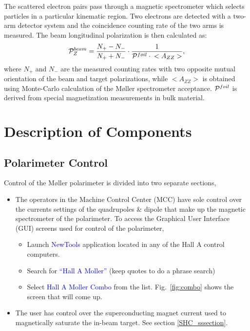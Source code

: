 {The scattered electron pairs pass through a magnetic spectrometer
which selects particles in a particular kinematic region. Two electrons
are detected with a two-arm detector system and the 
coincidence counting rate of the two arms is measured.
The beam longitudinal polarization is then calculated as:
\begin{displaymath}
           {\cal P}^{beam}_{Z} = \frac{N_{+}-N_{-}}{N_{+}+N_{-}}\cdot{}
      \frac{1}{{\cal P}^{foil}\cdot{}<A_{ZZ}>},
\end{displaymath}
where $N_{+}$ and $N_{-}$ are the measured counting rates with two opposite
mutual orientation of the beam and target polarizations, while 
$<A_{ZZ}>$ is obtained using Monte-Carlo calculation of the M{\o}ller 
spectrometer acceptance. ${\cal P}^{foil}$ is derived from special
magnetization measurements in bulk material.

\section{Description of Components}

\vspace{-\parskip}

\subsection{Polarimeter Control}
\vspace{-\parskip}

Control of the M{\o}ller polarimeter is divided into two separate sections,
\vspace{-\parskip}
\begin{itemize}
\item The operators in the Machine Control Center (MCC) have sole control over the currents settings of the quadrupoles \& dipole that make up the magnetic spectrometer
of the polarimeter.
To access the Graphical User Interface (GUI)
screens used for control of the polarimeter,
\vspace{-\parskip}
\begin{itemize}
\item Launch \textcolor{blue}{NewTools} application located in any of the Hall A control computers.
\item Search for \textcolor{blue}{``Hall A Moller''} (keep quotes to do a phrase search)
\item Select \textcolor{blue}{Hall A Moller Combo} from the list. Fig.~\ref{fig:combo} shows the screen that will come up.
\end{itemize}
\item The user has control over the superconducting magnet current used to magnetically saturate
the in-beam target. See section \ref{SHC_sssection}.
\end{itemize}

}
